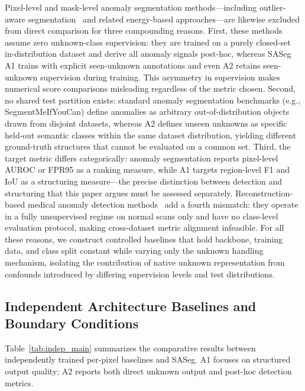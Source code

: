 \documentclass[journal]{IEEEtai}
\begin{document}
Pixel-level and mask-level anomaly segmentation methods---including outlier-aware
segmentation~\cite{grcic2023advantagesmask} and related energy-based approaches---are
likewise excluded from direct comparison for three compounding reasons.
First, these methods assume zero unknown-class supervision: they are trained on a
purely closed-set in-distribution dataset and derive all anomaly signals post-hoc,
whereas SASeg A1 trains with explicit seen-unknown annotations and even A2 retains
seen-unknown supervision during training.
This asymmetry in supervision makes numerical score comparisons misleading regardless
of the metric chosen.
Second, no shared test partition exists: standard anomaly segmentation benchmarks
(e.g., SegmentMeIfYouCan) define anomalies as arbitrary out-of-distribution objects
drawn from disjoint datasets, whereas A2 defines unseen unknowns as specific held-out
semantic classes within the same dataset distribution, yielding different ground-truth
structures that cannot be evaluated on a common set.
Third, the target metric differs categorically: anomaly segmentation reports pixel-level
AUROC or FPR95 as a ranking measure, while A1 targets region-level F1 and IoU as a
structuring measure---the precise distinction between detection and structuring that
this paper argues must be assessed separately.
Reconstruction-based medical anomaly detection methods~\cite{zimmerer2022mood2020}
add a fourth mismatch: they operate in a fully unsupervised regime on normal scans only
and have no class-level evaluation protocol, making cross-dataset metric alignment
infeasible.
For all these reasons, we construct controlled baselines that hold backbone, training
data, and class split constant while varying only the unknown handling mechanism,
isolating the contribution of native unknown representation from confounds introduced
by differing supervision levels and test distributions.

\subsection{Independent Architecture Baselines and Boundary Conditions}\label{sec:exp:indep}

Table~\ref{tab:indep_main} summarizes the comparative results between independently
trained per-pixel baselines and SASeg.
A1 focuses on structured output quality; A2 reports both direct unknown output and
post-hoc detection metrics.
\end{document}

